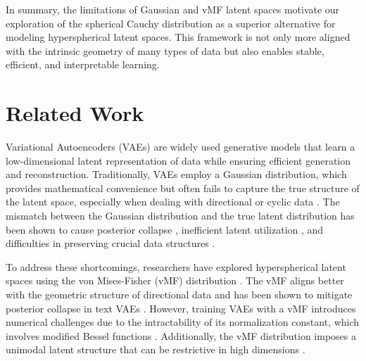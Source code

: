\documentclass{article}
\begin{document}
In summary, the limitations of Gaussian and vMF latent spaces motivate our exploration of the spherical Cauchy distribution as a superior alternative for modeling hyperspherical latent spaces. This framework is not only more aligned with the intrinsic geometry of many types of data but also enables stable, efficient, and interpretable learning.


\section{Related Work}

Variational Autoencoders (VAEs) are widely used generative models that learn a low-dimensional latent representation of data while ensuring efficient generation and reconstruction. Traditionally, VAEs employ a Gaussian distribution, which provides mathematical convenience but often fails to capture the true structure of the latent space, especially when dealing with directional or cyclic data \citep{davidson2018hyperspherical}. The mismatch between the Gaussian distribution and the true latent distribution has been shown to cause posterior collapse \citep{xu2018spherical}, inefficient latent utilization \citep{kim2024t3vae}, and difficulties in preserving crucial data structures \citep{tomczak2018vampprior}.

To address these shortcomings, researchers have explored hyperspherical latent spaces using the von Mises-Fisher (vMF) distribution \citep{davidson2018hyperspherical}. The vMF aligns better with the geometric structure of directional data and has been shown to mitigate posterior collapse in text VAEs \citep{xu2018spherical}. However, training VAEs with a vMF introduces numerical challenges due to the intractability of its normalization constant, which involves modified Bessel functions \citep{davidson2019increasing}. Additionally, the vMF distribution imposes a unimodal latent structure that can be restrictive in high dimensions \citep{davidson2019increasing}.
\end{document}

